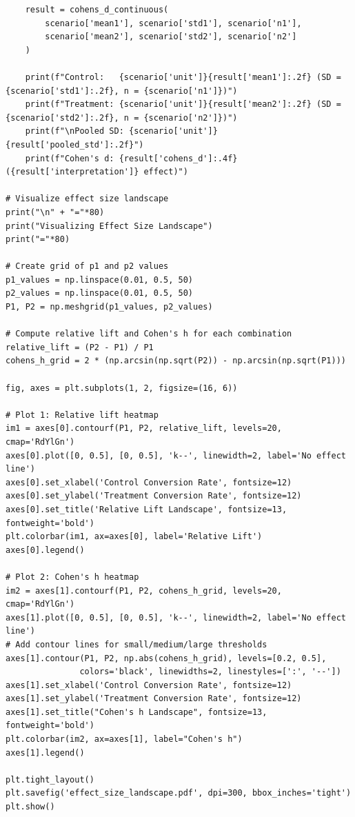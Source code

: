 \begin{lstlisting}
    result = cohens_d_continuous(
        scenario['mean1'], scenario['std1'], scenario['n1'],
        scenario['mean2'], scenario['std2'], scenario['n2']
    )

    print(f"Control:   {scenario['unit']}{result['mean1']:.2f} (SD = {scenario['std1']:.2f}, n = {scenario['n1']})")
    print(f"Treatment: {scenario['unit']}{result['mean2']:.2f} (SD = {scenario['std2']:.2f}, n = {scenario['n2']})")
    print(f"\nPooled SD: {scenario['unit']}{result['pooled_std']:.2f}")
    print(f"Cohen's d: {result['cohens_d']:.4f} ({result['interpretation']} effect)")

# Visualize effect size landscape
print("\n" + "="*80)
print("Visualizing Effect Size Landscape")
print("="*80)

# Create grid of p1 and p2 values
p1_values = np.linspace(0.01, 0.5, 50)
p2_values = np.linspace(0.01, 0.5, 50)
P1, P2 = np.meshgrid(p1_values, p2_values)

# Compute relative lift and Cohen's h for each combination
relative_lift = (P2 - P1) / P1
cohens_h_grid = 2 * (np.arcsin(np.sqrt(P2)) - np.arcsin(np.sqrt(P1)))

fig, axes = plt.subplots(1, 2, figsize=(16, 6))

# Plot 1: Relative lift heatmap
im1 = axes[0].contourf(P1, P2, relative_lift, levels=20, cmap='RdYlGn')
axes[0].plot([0, 0.5], [0, 0.5], 'k--', linewidth=2, label='No effect line')
axes[0].set_xlabel('Control Conversion Rate', fontsize=12)
axes[0].set_ylabel('Treatment Conversion Rate', fontsize=12)
axes[0].set_title('Relative Lift Landscape', fontsize=13, fontweight='bold')
plt.colorbar(im1, ax=axes[0], label='Relative Lift')
axes[0].legend()

# Plot 2: Cohen's h heatmap
im2 = axes[1].contourf(P1, P2, cohens_h_grid, levels=20, cmap='RdYlGn')
axes[1].plot([0, 0.5], [0, 0.5], 'k--', linewidth=2, label='No effect line')
# Add contour lines for small/medium/large thresholds
axes[1].contour(P1, P2, np.abs(cohens_h_grid), levels=[0.2, 0.5],
               colors='black', linewidths=2, linestyles=[':', '--'])
axes[1].set_xlabel('Control Conversion Rate', fontsize=12)
axes[1].set_ylabel('Treatment Conversion Rate', fontsize=12)
axes[1].set_title("Cohen's h Landscape", fontsize=13, fontweight='bold')
plt.colorbar(im2, ax=axes[1], label="Cohen's h")
axes[1].legend()

plt.tight_layout()
plt.savefig('effect_size_landscape.pdf', dpi=300, bbox_inches='tight')
plt.show()
\end{lstlisting}

